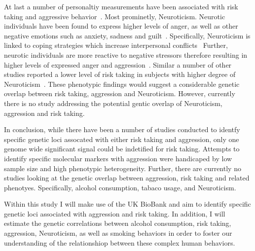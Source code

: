At last a number of personaltiy measurements have been associated with risk taking and aggressive behavior~\cite{Anderson2002a}.
Most prominetly, Neuroticism.
Neurotic individuals have been found to express higher levels of anger, as well as other negative emotions such as anxiety, sadness and guilt~\cite{Watson1984}.
Specifically, Neuroticism is linked to coping strategies which increase interpersonal conflicts~\cite{Bolger1991,Ode2008}
Further, neurotic individuals are more reactive to negative stressors therefore resulting in higher levels of expressed anger and aggression~\cite{Ode2008}.
Similar a number of other studies reported a lower level of risk taking in subjects with higher degree of Neuroticism~\cite{Lauriola2001,InstituteofMedicine2011,Paulus2003}.
These phenotypic findings would suggest a considerable genetic overlap between risk taking, aggression and Neuroticism.
However, currently there is no study addressing the potential gentic overlap of Neuroticism, aggression and risk taking.

In conclusion, while there have been a number of studies conducted to identfy specific genetic loci assocated  with either risk taking and aggression, only one genome wide significant signal could be indetified for risk taking.
Attempts to identify specific molecular markers with aggression were handicaped by low sample size and high phenotypic heterogeneity.
Further, there are currently no studies looking at the genetic overlap between aggression, risk taking and related phenotyes.
Specifically, alcohol consumption, tabaco usage, and Neuroticism.

Within this study I will make use of the UK BioBank and aim to identify specific genetic loci associated with aggression and risk taking.
In addition, I will estimate the genetic correlations between alcohol consumption, risk taking, aggression, Neuroticism, as well as smoking behaviors in order to foster our understanding of the relationshiop between these complex human behaviors.

